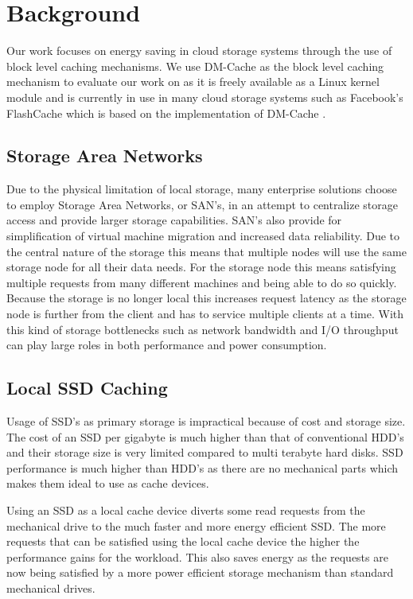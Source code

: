 \section{Background}

Our work focuses on energy saving in cloud storage systems through the use of
block level caching mechanisms. We use DM-Cache as the block level caching
mechanism to evaluate our work on as it is freely available as a Linux kernel
module and is currently in use in many cloud storage systems such as Facebook's
FlashCache which is based on the implementation of DM-Cache \cite{flashcache}.

\subsection{Storage Area Networks}

Due to the physical limitation of local storage, many enterprise solutions
choose to employ Storage Area Networks, or SAN's, in an attempt to centralize
storage access and provide larger storage capabilities. SAN's also provide for
simplification of virtual machine migration and increased data reliability. Due
to the central nature of the storage this means that multiple nodes will use the
same storage node for all their data needs. For the storage node this means
satisfying multiple requests from many different machines and being able to do
so quickly. Because the storage is no longer local this increases request
latency as the storage node is further from the client and has to service
multiple clients at a time. With this kind of storage bottlenecks such as
network bandwidth and I/O throughput can play large roles in both performance
and power consumption.

\subsection{Local SSD Caching}

Usage of SSD's as primary storage is impractical because of cost and storage
size. The cost of an SSD per gigabyte is much higher than that of conventional
HDD's and their storage size is very limited compared to multi terabyte hard
disks. SSD performance is much higher than HDD's as there are no mechanical
parts which makes them ideal to use as cache devices.

Using an SSD as a local cache device diverts some read requests from the
mechanical drive to the much faster and more energy efficient SSD. The more
requests that can be satisfied using the local cache device the higher the
performance gains for the workload. This also saves energy as the requests are
now being satisfied by a more power efficient storage mechanism than standard
mechanical drives.

